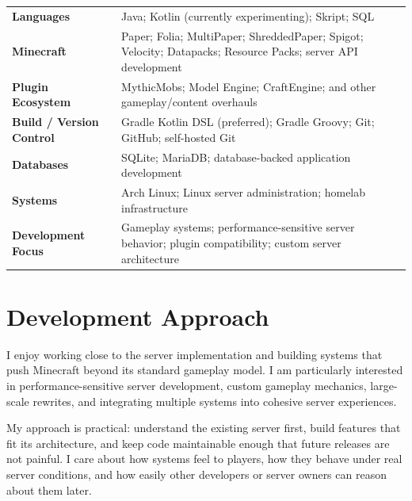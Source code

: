 \documentclass[10pt,letterpaper]{article}
\begin{document}
\begin{tabularx}{\textwidth}{@{}lX@{}}
\textbf{Languages} &
Java; Kotlin (currently experimenting); Skript; SQL \\[2pt]
\textbf{Minecraft} &
Paper; Folia; MultiPaper; ShreddedPaper; Spigot; Velocity;
Datapacks; Resource Packs; server API development \\[2pt]
\textbf{Plugin Ecosystem} &
MythicMobs; Model Engine; CraftEngine; and other gameplay/content
overhauls \\[2pt]
\textbf{Build / Version Control} &
Gradle Kotlin DSL (preferred); Gradle Groovy; Git; GitHub; self-hosted Git \\[2pt]
\textbf{Databases} &
SQLite; MariaDB; database-backed application development \\[2pt]
\textbf{Systems} &
Arch Linux; Linux server administration; homelab infrastructure \\[2pt]
\textbf{Development Focus} &
Gameplay systems; performance-sensitive server behavior; plugin compatibility;
custom server architecture
\end{tabularx}

\section{Development Approach}

I enjoy working close to the server implementation and building systems that
push Minecraft beyond its standard gameplay model. I am particularly interested
in performance-sensitive server development, custom gameplay mechanics,
large-scale rewrites, and integrating multiple systems into cohesive server
experiences.

My approach is practical: understand the existing server first, build features
that fit its architecture, and keep code maintainable enough that future
releases are not painful. I care about how systems feel to players, how they
behave under real server conditions, and how easily other developers or server
owners can reason about them later.
\end{document}
